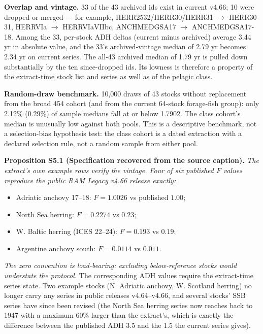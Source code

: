\documentclass[11pt]{article}
\begin{document}
\textbf{Overlap and vintage.} 33 of the 43 archived ids exist in current v4.66; 10 were dropped or merged --- for example, HERR2532/\allowbreak{}HERR30/\allowbreak{}HERR31 \(\to\) HERR30-31, HERRVIa \(\to\) HERRVIaVIIbc, ANCHMEDGSA17 \(\to\) ANCHMEDGSA17-18. Among the 33, per-stock ADH deltas (current minus archived) average 3.44 yr in absolute value, and the 33's archived-vintage median of 2.79 yr becomes 2.34 yr on current series. The all-43 archived median of 1.79 yr is pulled down substantially by the ten since-dropped ids. Its lowness is therefore a property of the extract-time stock list and series as well as of the pelagic class.

\textbf{Random-draw benchmark.} 10,000 draws of 43 stocks without replacement from the broad 454 cohort (and from the current 64-stock forage-fish group): only 2.12\% (0.29\%) of sample medians fall at or below 1.7902. The class cohort's median is unusually low against both pools. This is a descriptive benchmark, not a selection-bias hypothesis test: the class cohort is a dated extraction with a declared selection rule, not a random sample from either pool.

\textbf{Proposition S5.1 (Specification recovered from the source caption).} \emph{The extract's own example rows verify the vintage. Four of six published \(F\) values reproduce the public RAM Legacy v4.66 release exactly:}

\begin{itemize}\setlength{\itemsep}{2pt}
\item Adriatic anchovy 17--18: \(F = 1.0026\) vs published \(1.00\);
\item North Sea herring: \(F = 0.2274\) vs \(0.23\);
\item W. Baltic herring (ICES 22--24): \(F = 0.193\) vs \(0.19\);
\item Argentine anchovy south: \(F = 0.0114\) vs \(0.011\).
\end{itemize}

\emph{The zero convention is load-bearing: excluding below-reference stocks would understate the protocol.} The corresponding ADH values require the extract-time series state. Two example stocks (N. Adriatic anchovy, W. Scotland herring) no longer carry any series in public releases v4.64--v4.66, and several stocks' SSB series have since been revised (the North Sea herring series now reaches back to 1947 with a maximum 60\% larger than the extract's, which is exactly the difference between the published ADH 3.5 and the 1.5 the current series gives).
\end{document}
